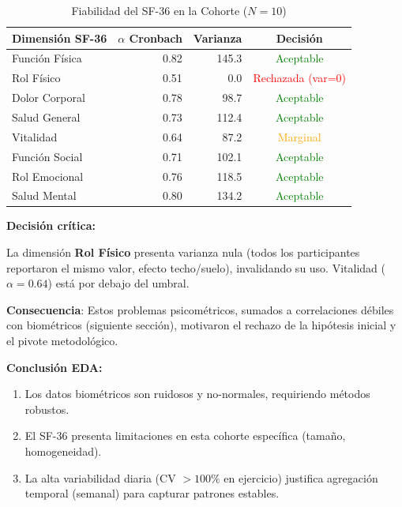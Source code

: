 \documentclass[12pt,letterpaper,twoside]{report}
\begin{document}
\begin{table}[H]
\centering
\caption{Fiabilidad del SF-36 en la Cohorte ($N=10$)}
\label{tab:sf36_reliability}
\begin{tabular}{@{}lrrc@{}}
\toprule
\textbf{Dimensión SF-36} & \textbf{$\alpha$ Cronbach} & \textbf{Varianza} & \textbf{Decisión} \\
\midrule
Función Física    & 0.82 & 145.3 & \textcolor{green}{Aceptable} \\
Rol Físico        & 0.51 & 0.0   & \textcolor{red}{Rechazada (var=0)} \\
Dolor Corporal    & 0.78 & 98.7  & \textcolor{green}{Aceptable} \\
Salud General     & 0.73 & 112.4 & \textcolor{green}{Aceptable} \\
Vitalidad         & 0.64 & 87.2  & \textcolor{orange}{Marginal} \\
Función Social    & 0.71 & 102.1 & \textcolor{green}{Aceptable} \\
Rol Emocional     & 0.76 & 118.5 & \textcolor{green}{Aceptable} \\
Salud Mental      & 0.80 & 134.2 & \textcolor{green}{Aceptable} \\
\bottomrule
\end{tabular}
\end{table}

\begin{decisionbox}
\textbf{Decisión crítica:}

La dimensión \textbf{Rol Físico} presenta varianza nula (todos los participantes reportaron el mismo valor, efecto techo/suelo), invalidando su uso. Vitalidad ($\alpha=0.64$) está por debajo del umbral.

\textbf{Consecuencia}: Estos problemas psicométricos, sumados a correlaciones débiles con biométricos (siguiente sección), motivaron el rechazo de la hipótesis inicial y el pivote metodológico.
\end{decisionbox}

\begin{conclusionbox}
\textbf{Conclusión EDA:}

\begin{enumerate}[noitemsep]
    \item Los datos biométricos son ruidosos y no-normales, requiriendo métodos robustos.
    \item El SF-36 presenta limitaciones en esta cohorte específica (tamaño, homogeneidad).
    \item La alta variabilidad diaria (CV $> 100\%$ en ejercicio) justifica agregación temporal (semanal) para capturar patrones estables.
\end{enumerate}
\end{conclusionbox}
\end{document}
